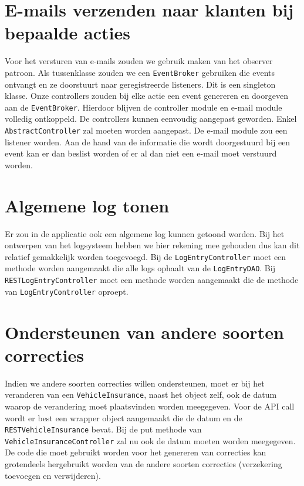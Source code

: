 \documentclass{article}
\begin{document}
\section{E-mails verzenden naar klanten bij bepaalde acties}

Voor het versturen van e-mails zouden we gebruik maken van het observer patroon. Als tussenklasse zouden we een \verb|EventBroker| gebruiken die events ontvangt en ze doorstuurt naar geregistreerde listeners. Dit is een singleton klasse. Onze controllers zouden bij elke actie een event genereren en doorgeven aan de \verb|EventBroker|. Hierdoor blijven de controller module en e-mail module volledig ontkoppeld. De controllers kunnen eenvoudig aangepast geworden. Enkel \verb|AbstractController| zal moeten worden aangepast. De e-mail module zou een listener worden. Aan de hand van de informatie die wordt doorgestuurd bij een event kan er dan beslist worden of er al dan niet een e-mail moet verstuurd worden.

\section{Algemene log tonen}

Er zou in de applicatie ook een algemene log kunnen getoond worden. Bij het ontwerpen van het logsysteem hebben we hier rekening mee gehouden dus kan dit relatief gemakkelijk worden toegevoegd. Bij de \verb|LogEntryController| moet een methode worden aangemaakt die alle logs ophaalt van de \verb|LogEntryDAO|. Bij \verb|RESTLogEntryController| moet een methode worden aangemaakt die de methode van \verb|LogEntryController| oproept.

\section{Ondersteunen van andere soorten correcties}

Indien we andere soorten correcties willen ondersteunen, moet er bij het veranderen van een \verb|VehicleInsurance|, naast het object zelf, ook de datum waarop de verandering moet plaatsvinden worden meegegeven.  Voor de API call wordt er best een wrapper object aangemaakt die de datum en de \verb|RESTVehicleInsurance| bevat. Bij de put methode van \verb|VehicleInsuranceController| zal nu ook de datum moeten worden meegegeven. De code die moet gebruikt worden voor het genereren van correcties kan grotendeels hergebruikt worden van de andere soorten correcties (verzekering toevoegen en verwijderen).
\end{document}
